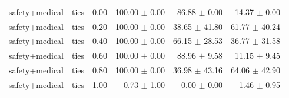 \documentclass{article}
\begin{document}
\begin{table}[H]
{\begin{tabular}{lllrrr}
safety+medical & ties & 0.00 & 100.00 $\pm$ 0.00 & 86.88 $\pm$ 0.00 & 14.37 $\pm$ 0.00 \\
safety+medical & ties & 0.20 & 100.00 $\pm$ 0.00 & 38.65 $\pm$ 41.80 & 61.77 $\pm$ 40.24 \\
safety+medical & ties & 0.40 & 100.00 $\pm$ 0.00 & 66.15 $\pm$ 28.53 & 36.77 $\pm$ 31.58 \\
safety+medical & ties & 0.60 & 100.00 $\pm$ 0.00 & 88.96 $\pm$ 9.58 & 11.15 $\pm$ 9.45 \\
safety+medical & ties & 0.80 & 100.00 $\pm$ 0.00 & 36.98 $\pm$ 43.16 & 64.06 $\pm$ 42.90 \\
safety+medical & ties & 1.00 & 0.73 $\pm$ 1.00 & 0.00 $\pm$ 0.00 & 1.46 $\pm$ 0.95 \\
\bottomrule
\end{tabular}
}
\end{table}


\begin{table}[H]
\centering
\caption{予備実験 シード別詳細 - Method: mergealign, Pattern: safety+medical}
\label{tab:prelim_seeds_mergealign_safety_medical}
\small
{}
\end{table}
\end{document}
